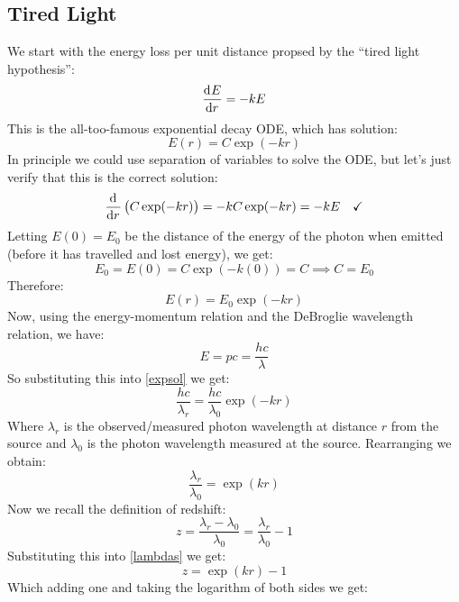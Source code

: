 \subsection{Tired Light}
We start with the energy loss per unit distance propsed by the ``tired light hypothesis'':
\begin{equation}
    \dod{E}{r} = -kE
\end{equation}
This is the all-too-famous exponential decay ODE, which has solution:
\begin{equation}
    E(r) = C\exp(-kr)
\end{equation}
In principle we could use separation of variables to solve the ODE, but let's just verify that this is the correct solution:
\begin{equation}
    \dod{}{r}\left(C\exp(-kr)\right) = -kC\exp(-kr) = -kE\quad  \checkmark
\end{equation}
Letting $E(0) = E_0$ be the distance of the energy of the photon when emitted (before it has travelled and lost energy), we get:
\begin{equation}
    E_0 = E(0) = C\exp(-k(0)) = C \implies C = E_0
\end{equation}
Therefore:
\begin{equation}\label{expsol}
    E(r) = E_0\exp(-kr)
\end{equation}
Now, using the energy-momentum relation and the DeBroglie wavelength relation, we have:
\begin{equation}
    E = pc = \frac{hc}{\lambda}
\end{equation}
So substituting this into \eqref{expsol} we get:
\begin{equation}
    \frac{hc}{\lambda_r} = \frac{hc}{\lambda_0}\exp(-kr)
\end{equation}
Where $\lambda_r$ is the observed/measured photon wavelength at distance $r$ from the source and $\lambda_0$ is the photon wavelength measured at the source. Rearranging we obtain:
\begin{equation}\label{lambdas}
    \frac{\lambda_r}{\lambda_0} = \exp(kr)
\end{equation}
Now we recall the definition of redshift:
\begin{equation}
    z = \frac{\lambda_r - \lambda_0}{\lambda_0} = \frac{\lambda_r}{\lambda_0} - 1
\end{equation}
Substituting this into \eqref{lambdas} we get:
\begin{equation}
    z = \exp(kr) - 1
\end{equation}
Which adding one and taking the logarithm of both sides we get:
